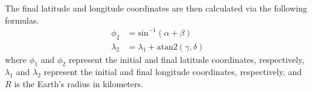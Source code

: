 \documentclass{article}
\begin{document}
The final latitude and longitude coordinates are then calculated via the following formulas.
\begin{align*}
    \phi_2 &= \text{sin}^{-1} \left( \alpha
    + \beta \right) \\
    \lambda_2 &= \lambda_1 + \text{atan2} \left( 
    \gamma, \delta \right)
\end{align*}
where $\phi_1$ and $\phi_2$ represent the initial and final latitude coordinates, respectively, $\lambda_1$ 
and $\lambda_2$ represent the initial and final longitude coordinates, respectively, and $R$ is the Earth's 
radius in kilometers.
\end{document}
